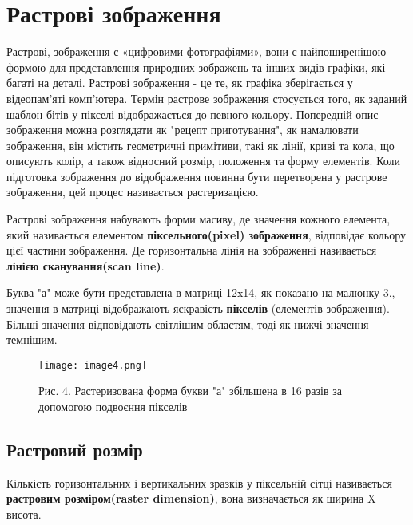 \chapter{Растрові зображення}\label{cha:bitmap_image}

Растрові, зображення є «цифровими фотографіями», вони є найпоширенішою формою для представлення природних зображень та інших видів графіки, які багаті на деталі.
Растрові зображення - це те, як графіка зберігається у відеопам’яті комп’ютера.
Термін растрове зображення стосується того, як заданий шаблон бітів у пікселі відображається до певного кольору.
Попередній опис зображення можна розглядати як "рецепт приготування", як намалювати зображення, він містить геометричні примітиви, такі як лінії, криві та кола, що описують колір, а також відносний розмір, положення та форму елементів.
Коли підготовка зображення до відображення повинна бути перетворена у растрове зображення, цей процес називається растеризацією.

Растрові зображення набувають форми масиву, де значення кожного елемента, який називається елементом \textbf{піксельного(pixel) зображення}, відповідає кольору цієї частини зображення.
Де горизонтальна лінія на зображенні називається \textbf{лінією сканування(scan line)}.

Буква "а" може бути представлена в матриці 12x14, як показано на малюнку 3., значення в матриці відображають яскравість \textbf{пікселів} (елементів зображення).
Більші значення відповідають світлішим областям, тоді як нижчі значення темнішим.

\begin{figure}
    \label{fig:image4}
    \centering
    \texttt{[image: image4.png]}

    Рис. 4. Растеризована форма букви "а" збільшена в 16 разів за допомогою подвоєння пікселів
\end{figure}

\section{Растровий розмір}\label{sec:raster_sdimensions}
Кількість горизонтальних і вертикальних зразків у піксельній сітці називається \textbf{растровим розміром(raster dimension)}, вона визначається як ширина X висота.
